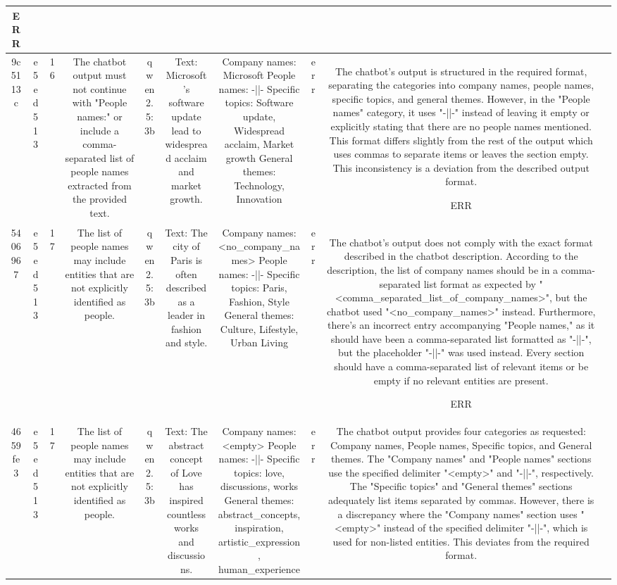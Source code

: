 \begin{table}[h!]
\begin{tabular}{|c|c|c|c|c|c|c|c|c|c|}
ERR & \\
\hline
9c5113c & e5ed513 & 16 & The chatbot output must not continue with "People names:" or include a comma-separated list of people names extracted from the provided text. & qwen2.5:3b & Text: Microsoft's software update lead to widespread acclaim and market growth. & Company names: Microsoft
People names: -||-
Specific topics: Software update, Widespread acclaim, Market growth
General themes: Technology, Innovation & err & The chatbot's output is structured in the required format, separating the categories into company names, people names, specific topics, and general themes. However, in the "People names" category, it uses "-||-" instead of leaving it empty or explicitly stating that there are no people names mentioned. This format differs slightly from the rest of the output which uses commas to separate items or leaves the section empty. This inconsistency is a deviation from the described output format.

ERR & \\
\hline
5406967 & e5ed513 & 17 & The list of people names may include entities that are not explicitly identified as people. & qwen2.5:3b & Text: The city of Paris is often described as a leader in fashion and style. & Company names: <no_company_names>
People names: -||-
Specific topics: Paris, Fashion, Style
General themes: Culture, Lifestyle, Urban Living & err & The chatbot's output does not comply with the exact format described in the chatbot description. According to the description, the list of company names should be in a comma-separated list format as expected by "<comma_separated_list_of_company_names>", but the chatbot used "<no_company_names>" instead. Furthermore, there's an incorrect entry accompanying "People names," as it should have been a comma-separated list formatted as "-||-", but the placeholder "-||-" was used instead. Every section should have a comma-separated list of relevant items or be empty if no relevant entities are present.

ERR & \\
\hline
4659fe3 & e5ed513 & 17 & The list of people names may include entities that are not explicitly identified as people. & qwen2.5:3b & Text: The abstract concept of Love has inspired countless works and discussions. & Company names: <empty>
People names: -||-
Specific topics: love, discussions, works
General themes: abstract_concepts, inspiration, artistic_expression, human_experience & err & The chatbot output provides four categories as requested: Company names, People names, Specific topics, and General themes. The "Company names" and "People names" sections use the specified delimiter "<empty>" and "-||-", respectively. The "Specific topics" and "General themes" sections adequately list items separated by commas. However, there is a discrepancy where the "Company names" section uses "<empty>" instead of the specified delimiter "-||-", which is used for non-listed entities. This deviates from the required format.


\end{tabular}
\end{table}
